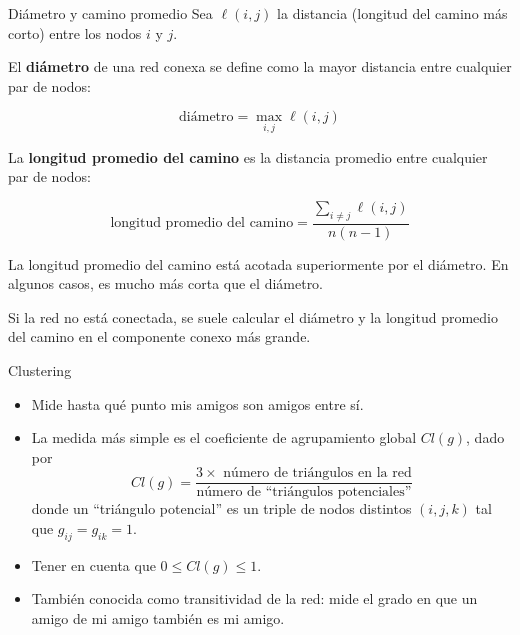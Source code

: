 \documentclass[11pt]{beamer}
\begin{document}
\begin{frame}{Diámetro y camino promedio}
    Sea $\ell(i, j)$ la distancia (longitud del camino más corto) entre los nodos $i$ y $j$.

El \textbf{diámetro} de una red conexa se define como la mayor distancia entre cualquier par de nodos:

$$
\text{diámetro} = \max_{i, j} \ell(i, j)
$$

La \textbf{longitud promedio del camino} es la distancia promedio entre cualquier par de nodos:

$$
\text{longitud promedio del camino} = \frac{\sum_{i \neq j} \ell(i, j)}{n(n-1)}
$$

La longitud promedio del camino está acotada superiormente por el diámetro. En algunos casos, es mucho más corta que el diámetro.

Si la red no está conectada, se suele calcular el diámetro y la longitud promedio del camino en el componente conexo más grande.
\end{frame}


\begin{frame}{Clustering}
    \begin{itemize}
        \item Mide hasta qué punto mis amigos son amigos entre sí.
\item La medida más simple es el coeficiente de agrupamiento global $Cl(g)$, dado por 
\begin{equation*}
Cl (g ) =\frac{ 3 \times \text{ número de triángulos en la red}}{\text{número de “triángulos potenciales”}}
\end{equation*}
 donde un “triángulo potencial” es un triple de nodos distintos $(i, j, k )$ tal que $g_{ij} = g_{ik} = 1$.

     \item Tener en cuenta que $0 \leq Cl (g ) \leq 1$.
\item  También conocida como transitividad de la red: mide el grado en que un amigo de mi amigo también es mi amigo.
    \end{itemize}
\end{frame}
\end{document}

